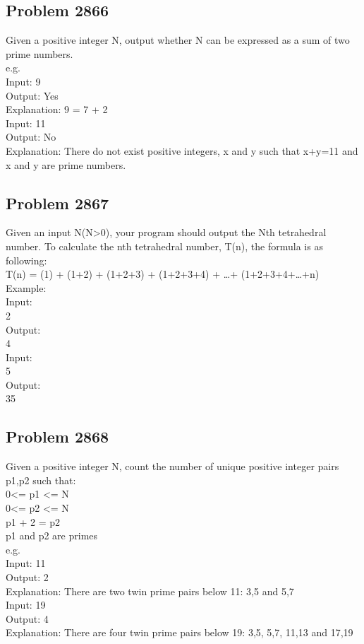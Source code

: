 \subsection{Problem 2866}

Given a positive integer N, output whether N can be expressed as a sum of two prime numbers.
\\e.g.
\\Input: 9
\\Output: Yes
\\Explanation: 9 = 7 + 2
\\Input: 11
\\Output: No
\\Explanation: There do not exist positive integers, x and y such that x+y=11 and x and y are prime numbers.

\subsection{Problem 2867}

Given an input N(N>0), your program should output the Nth tetrahedral number. To calculate the nth tetrahedral number, T(n), the formula is as following:
\\T(n) = (1) + (1+2) + (1+2+3) + (1+2+3+4) + \ldots + (1+2+3+4+\ldots+n)
\\Example:
\\Input:
\\2
\\Output:
\\4
\\Input:
\\5
\\Output:
\\35

\subsection{Problem 2868}

Given a positive integer N, count the number of unique positive integer pairs {p1,p2} such that:
\\0<= p1 <= N
\\0<= p2 <= N
\\p1 + 2 = p2
\\p1 and p2 are primes
\\e.g.
\\Input: 11
\\Output: 2
\\Explanation: There are two twin prime pairs below 11: {3,5} and {5,7}
\\Input: 19
\\Output: 4
\\Explanation: There are four twin prime pairs below 19: {3,5}, {5,7}, {11,13} and {17,19}

